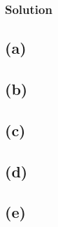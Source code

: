 \documentclass[submit]{harvardml}
\begin{document}
\subsubsection*{Solution}

\subsection*{(a)}

\subsection*{(b)}

\subsection*{(c)}

\subsection*{(d)}

\subsection*{(e)}
\end{document}
